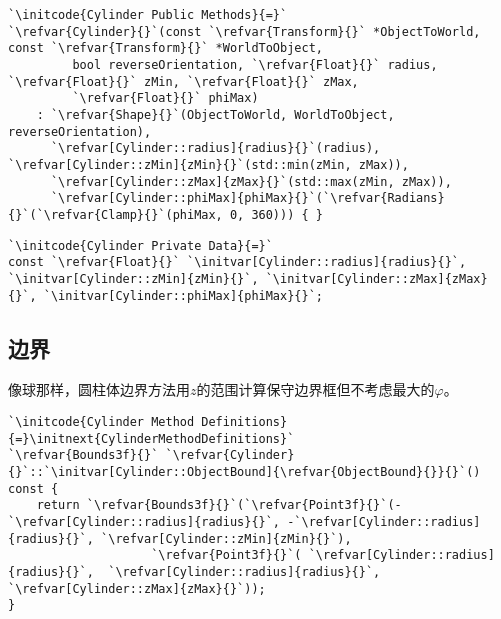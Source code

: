\begin{lstlisting}
`\initcode{Cylinder Public Methods}{=}`
`\refvar{Cylinder}{}`(const `\refvar{Transform}{}` *ObjectToWorld, const `\refvar{Transform}{}` *WorldToObject,
         bool reverseOrientation, `\refvar{Float}{}` radius, `\refvar{Float}{}` zMin, `\refvar{Float}{}` zMax,
         `\refvar{Float}{}` phiMax)
    : `\refvar{Shape}{}`(ObjectToWorld, WorldToObject, reverseOrientation),
      `\refvar[Cylinder::radius]{radius}{}`(radius), `\refvar[Cylinder::zMin]{zMin}{}`(std::min(zMin, zMax)),
      `\refvar[Cylinder::zMax]{zMax}{}`(std::max(zMin, zMax)),
      `\refvar[Cylinder::phiMax]{phiMax}{}`(`\refvar{Radians}{}`(`\refvar{Clamp}{}`(phiMax, 0, 360))) { }
\end{lstlisting}
\begin{lstlisting}
`\initcode{Cylinder Private Data}{=}`
const `\refvar{Float}{}` `\initvar[Cylinder::radius]{radius}{}`, `\initvar[Cylinder::zMin]{zMin}{}`, `\initvar[Cylinder::zMax]{zMax}{}`, `\initvar[Cylinder::phiMax]{phiMax}{}`;
\end{lstlisting}

\subsection{边界}\label{sub:边界3}
像球那样，圆柱体边界方法用$z$的范围计算保守边界框但不考虑最大的$\varphi$。
\begin{lstlisting}
`\initcode{Cylinder Method Definitions}{=}\initnext{CylinderMethodDefinitions}`
`\refvar{Bounds3f}{}` `\refvar{Cylinder}{}`::`\initvar[Cylinder::ObjectBound]{\refvar{ObjectBound}{}}{}`() const {
    return `\refvar{Bounds3f}{}`(`\refvar{Point3f}{}`(-`\refvar[Cylinder::radius]{radius}{}`, -`\refvar[Cylinder::radius]{radius}{}`, `\refvar[Cylinder::zMin]{zMin}{}`),
                    `\refvar{Point3f}{}`( `\refvar[Cylinder::radius]{radius}{}`,  `\refvar[Cylinder::radius]{radius}{}`, `\refvar[Cylinder::zMax]{zMax}{}`));
}
\end{lstlisting}

